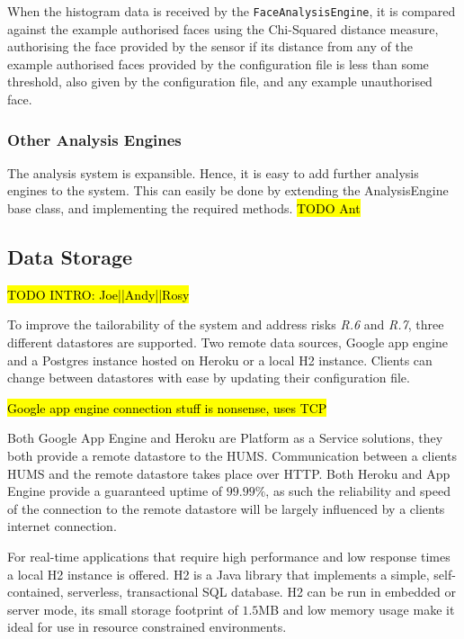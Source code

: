 \documentclass[10pt,a4paper]{article}
\begin{document}
When the histogram data is received by the \texttt{FaceAnalysisEngine}, it is compared against the example authorised faces using the Chi-Squared distance measure, authorising the face provided by the sensor if its distance from any of the example authorised faces provided by the configuration file is less than some threshold, also given by the configuration file, and any example unauthorised face.


\subsubsection{Other Analysis Engines}
The analysis system is expansible. Hence, it is easy to add further analysis engines to the system. This can easily be done by extending the AnalysisEngine base class, and implementing the required methods. \hl{TODO Ant}

\subsection{Data Storage}
\label{sec:store}
\hl{TODO INTRO: Joe||Andy||Rosy}

To improve the tailorability of the system and address risks \emph{R.6} and \emph{R.7}, three different datastores are supported. Two remote data sources, Google app engine and a Postgres instance hosted on Heroku or a local H2 instance. Clients can change between datastores with ease by updating their configuration file.

\hl{Google app engine connection stuff is nonsense, uses TCP}

Both Google App Engine and Heroku are Platform as a Service solutions, they both provide a remote datastore to the HUMS. Communication between a clients HUMS and the remote datastore takes place over HTTP. Both Heroku and App Engine provide a guaranteed uptime of $99.99\%$, as such the reliability and speed of the connection to the remote datastore will be largely influenced by a clients internet connection.

For real-time applications that require high performance and low response times a local H2 instance is offered. H2 is a Java library that implements a simple, self-contained, serverless, transactional SQL database. H2 can be run in embedded or server mode, its small storage footprint of $1.5$MB and low memory usage make it ideal for use in resource constrained environments. 
\end{document}
